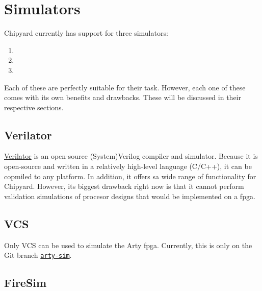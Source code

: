 \chapter{Simulators}\label{chap:Simulators}
Chipyard currently has support for three simulators:
\begin{enumerate}
\item {}
\item {}
\item {}
\end{enumerate}

Each of these are perfectly suitable for their task.
However, each one of these comes with its own benefits and drawbacks.
These will be discussed in their respective sections.

\section{Verilator}\label{sec:Verilator_Simulator}
\href{https://www.veripool.org/wiki/verilator}{Verilator} is an open-source (System)Verilog compiler and simulator.
Because it is open-source and written in a relatively high-level language (C/C++), it can be copmiled to any platform.
In addition, it offers sa wide range of functionality for Chipyard.
However, its biggest drawback right now is that it cannot perform validation simulations of procesor designs that would be implemented on a \gls{fpga}.

\section{VCS}\label{sec:VCS_Simulator}
Only VCS can be used to simulate the Arty \Gls{fpga}.
Currently, this is only on the Git branch \href{https://github.com/ucb-bar/chipyard/tree/arty-sim}{\texttt{arty-sim}}.

\section{FireSim}\label{sec:FireSim_Simulator}
\nocite{firesimPresentation}

